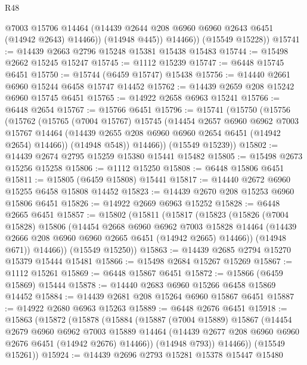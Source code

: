 \begin{lexlean}{R48}
\begin{coremodule}
              @7003
              @15706
              @14464
              (@14439 @2644 @208 @6960 @6960 @2643 @6451 (@14942 @2643) @14466))
            (@14948 @445))
          @14466))
      (@15549 @15228))
@15741 := @14439 @2663 @2796 @15248 @15381 @15438 @15483
@15744 := @15498 @2662 @15245 @15247
@15745 := @1112 @15239
@15747 := @6448 @15745 @6451
@15750 := @15744 (@6459 @15747) @15438
@15756 := @14440 @2661 @6960 @15244 @6458 @15747 @14452
@15762 := @14439 @2659 @208 @15242 @6960 @15745 @6451
@15765 := @14922 @2658 @6963 @15241
@15766 := @6448 @2654
@15767 := @15766 @6451
@15796 := @15741
    (@15750
      (@15756
        (@15762
          (@15765
            (@7004 @15767)
            @15745
            (@14454
              @2657
              @6960
              @6962
              @7003
              @15767
              @14464
              (@14439 @2655 @208 @6960 @6960 @2654 @6451 (@14942 @2654) @14466))
            (@14948 @548))
          @14466))
      (@15549 @15239))
@15802 := @14439 @2674 @2795 @15259 @15380 @15441 @15482
@15805 := @15498 @2673 @15256 @15258
@15806 := @1112 @15250
@15808 := @6448 @15806 @6451
@15811 := @15805 (@6459 @15808) @15441
@15817 := @14440 @2672 @6960 @15255 @6458 @15808 @14452
@15823 := @14439 @2670 @208 @15253 @6960 @15806 @6451
@15826 := @14922 @2669 @6963 @15252
@15828 := @6448 @2665 @6451
@15857 := @15802
    (@15811
      (@15817
        (@15823
          (@15826
            (@7004 @15828)
            @15806
            (@14454
              @2668
              @6960
              @6962
              @7003
              @15828
              @14464
              (@14439 @2666 @208 @6960 @6960 @2665 @6451 (@14942 @2665) @14466))
            (@14948 @671))
          @14466))
      (@15549 @15250))
@15863 := @14439 @2685 @2794 @15270 @15379 @15444 @15481
@15866 := @15498 @2684 @15267 @15269
@15867 := @1112 @15261
@15869 := @6448 @15867 @6451
@15872 := @15866 (@6459 @15869) @15444
@15878 := @14440 @2683 @6960 @15266 @6458 @15869 @14452
@15884 := @14439 @2681 @208 @15264 @6960 @15867 @6451
@15887 := @14922 @2680 @6963 @15263
@15889 := @6448 @2676 @6451
@15918 := @15863
    (@15872
      (@15878
        (@15884
          (@15887
            (@7004 @15889)
            @15867
            (@14454
              @2679
              @6960
              @6962
              @7003
              @15889
              @14464
              (@14439 @2677 @208 @6960 @6960 @2676 @6451 (@14942 @2676) @14466))
            (@14948 @793))
          @14466))
      (@15549 @15261))
@15924 := @14439 @2696 @2793 @15281 @15378 @15447 @15480

\end{coremodule}
\end{lexlean}
